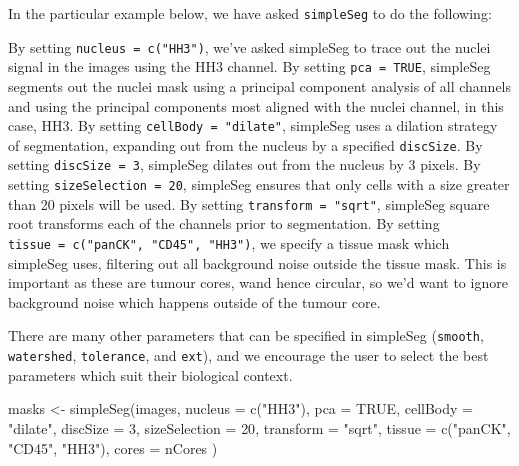 \documentclass[
  letterpaper,
  DIV=11,
  numbers=noendperiod]{scrreprt}
\newenvironment{Shaded}{\begin{snugshade}}{\end{snugshade}}
\newcommand{\AttributeTok}[1]{\textcolor[rgb]{0.40,0.45,0.13}{#1}}
\newcommand{\ConstantTok}[1]{\textcolor[rgb]{0.56,0.35,0.01}{#1}}
\newcommand{\DecValTok}[1]{\textcolor[rgb]{0.68,0.00,0.00}{#1}}
\newcommand{\FunctionTok}[1]{\textcolor[rgb]{0.28,0.35,0.67}{#1}}
\newcommand{\NormalTok}[1]{\textcolor[rgb]{0.00,0.23,0.31}{#1}}
\newcommand{\OtherTok}[1]{\textcolor[rgb]{0.00,0.23,0.31}{#1}}
\newcommand{\StringTok}[1]{\textcolor[rgb]{0.13,0.47,0.30}{#1}}
\begin{document}
In the particular example below, we have asked \texttt{simpleSeg} to do
the following:

By setting \texttt{nucleus\ =\ c("HH3")}, we've asked simpleSeg to trace
out the nuclei signal in the images using the HH3 channel. By setting
\texttt{pca\ =\ TRUE}, simpleSeg segments out the nuclei mask using a
principal component analysis of all channels and using the principal
components most aligned with the nuclei channel, in this case, HH3. By
setting \texttt{cellBody\ =\ "dilate"}, simpleSeg uses a dilation
strategy of segmentation, expanding out from the nucleus by a specified
\texttt{discSize}. By setting \texttt{discSize\ =\ 3}, simpleSeg dilates
out from the nucleus by 3 pixels. By setting
\texttt{sizeSelection\ =\ 20}, simpleSeg ensures that only cells with a
size greater than 20 pixels will be used. By setting
\texttt{transform\ =\ "sqrt"}, simpleSeg square root transforms each of
the channels prior to segmentation. By setting
\texttt{tissue\ =\ c("panCK",\ "CD45",\ "HH3")}, we specify a tissue
mask which simpleSeg uses, filtering out all background noise outside
the tissue mask. This is important as these are tumour cores, wand hence
circular, so we'd want to ignore background noise which happens outside
of the tumour core.

There are many other parameters that can be specified in simpleSeg
(\texttt{smooth}, \texttt{watershed}, \texttt{tolerance}, and
\texttt{ext}), and we encourage the user to select the best parameters
which suit their biological context.

\begin{Shaded}
\begin{Highlighting}[]
\NormalTok{masks }\OtherTok{\textless{}{-}} \FunctionTok{simpleSeg}\NormalTok{(images,}
                   \AttributeTok{nucleus =} \FunctionTok{c}\NormalTok{(}\StringTok{"HH3"}\NormalTok{),}
                   \AttributeTok{pca =} \ConstantTok{TRUE}\NormalTok{,}
                   \AttributeTok{cellBody =} \StringTok{"dilate"}\NormalTok{,}
                   \AttributeTok{discSize =} \DecValTok{3}\NormalTok{,}
                   \AttributeTok{sizeSelection =} \DecValTok{20}\NormalTok{,}
                   \AttributeTok{transform =} \StringTok{"sqrt"}\NormalTok{,}
                   \AttributeTok{tissue =} \FunctionTok{c}\NormalTok{(}\StringTok{"panCK"}\NormalTok{, }\StringTok{"CD45"}\NormalTok{, }\StringTok{"HH3"}\NormalTok{),}
                   \AttributeTok{cores =}\NormalTok{ nCores}
\NormalTok{                   )}
\end{Highlighting}
\end{Shaded}
\end{document}
